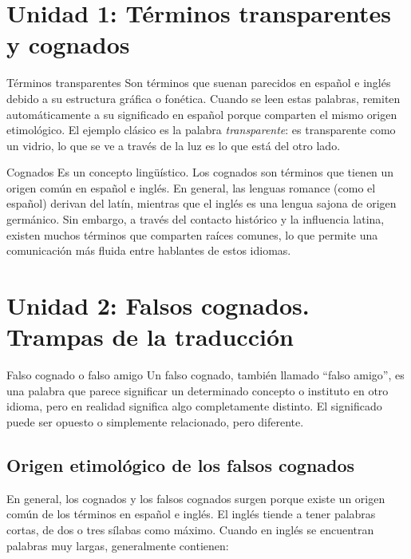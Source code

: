 \documentclass[12pt,oneside]{book}
\begin{document}
\section{Unidad 1: Términos transparentes y cognados}

\begin{definition}{Términos transparentes}
Son términos que suenan parecidos en español e inglés debido a su estructura gráfica o fonética. Cuando se leen estas palabras, remiten automáticamente a su significado en español porque comparten el mismo origen etimológico. El ejemplo clásico es la palabra \textit{transparente}: es transparente como un vidrio, lo que se ve a través de la luz es lo que está del otro lado.
\end{definition}

\begin{definition}{Cognados}
Es un concepto lingüístico. Los cognados son términos que tienen un origen común en español e inglés. En general, las lenguas romance (como el español) derivan del latín, mientras que el inglés es una lengua sajona de origen germánico. Sin embargo, a través del contacto histórico y la influencia latina, existen muchos términos que comparten raíces comunes, lo que permite una comunicación más fluida entre hablantes de estos idiomas.
\end{definition}

\section{Unidad 2: Falsos cognados. Trampas de la traducción}

\begin{definition}{Falso cognado o falso amigo}
Un falso cognado, también llamado ``falso amigo'', es una palabra que parece significar un determinado concepto o instituto en otro idioma, pero en realidad significa algo completamente distinto. El significado puede ser opuesto o simplemente relacionado, pero diferente.
\end{definition}

\subsection{Origen etimológico de los falsos cognados}

En general, los cognados y los falsos cognados surgen porque existe un origen común de los términos en español e inglés. El inglés tiende a tener palabras cortas, de dos o tres sílabas como máximo. Cuando en inglés se encuentran palabras muy largas, generalmente contienen:
\end{document}
